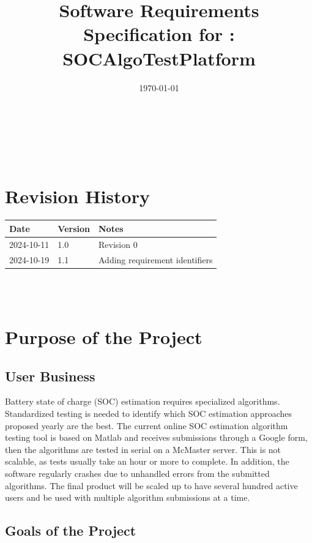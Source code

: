 \documentclass[12pt]{article}
\begin{document}
\title{Software Requirements Specification for \progname: SOCAlgoTestPlatform} 
\author{\authname}
\date{\today}
	
\maketitle

~\newpage


\tableofcontents

~\newpage

\section*{Revision History}

\begin{tabularx}{\textwidth}{p{3cm}p{2cm}X}
\toprule {\textbf{Date}} & {\textbf{Version}} & {\textbf{Notes}}\\
\midrule
2024-10-11 & 1.0 & Revision 0\\
2024-10-19 & 1.1 & Adding requirement identifiers \\
\bottomrule
\end{tabularx}

~\\

~\newpage
\section{Purpose of the Project}
\subsection{User Business}
Battery state of charge (SOC) estimation requires specialized algorithms. Standardized testing is needed to identify which SOC estimation approaches proposed yearly are the best. The current online SOC estimation algorithm testing tool is based on Matlab and receives submissions through a Google form, then the algorithms are tested in serial on a McMaster server. This is not scalable, as tests usually take an hour or more to complete. In addition, the software regularly crashes due to unhandled errors from the submitted algorithms. The final product will be scaled up to have several hundred active users and be used with multiple algorithm submissions at a time.
\subsection{Goals of the Project}
\end{document}
